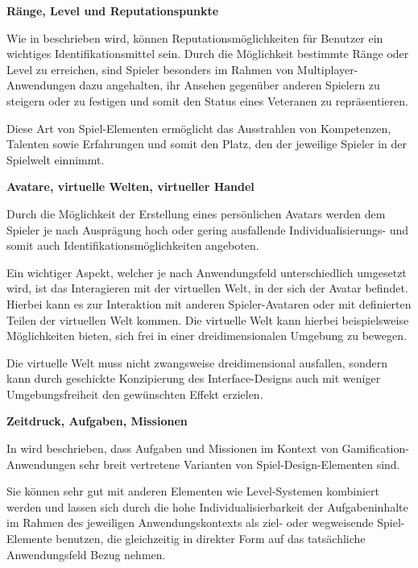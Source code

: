 \documentclass[bibliography=totoc,listof=totoc,BCOR=5mm,DIV=12,oneside]{scrbook}
\begin{document}
\par \bigskip \textbf{Ränge, Level und Reputationspunkte}
\par Wie in \citep[Kapitel 4.5 Reputations, Ranks and Levels, Seite 75]{reeves2009total} beschrieben wird, können Reputationsmöglichkeiten für Benutzer ein wichtiges Identifikationsmittel sein. Durch die Möglichkeit bestimmte Ränge oder Level zu erreichen, sind Spieler besonders im Rahmen von Multiplayer-Anwendungen dazu angehalten, ihr Ansehen gegenüber anderen Spielern zu steigern oder zu festigen und somit den Status eines Veteranen zu repräsentieren.
\par Diese Art von Spiel-Elementen ermöglicht das Ausstrahlen von Kompetenzen, Talenten sowie Erfahrungen und somit den Platz, den der jeweilige Spieler in der Spielwelt einnimmt.

\par \bigskip \textbf{Avatare, virtuelle Welten, virtueller Handel}
\par Durch die Möglichkeit der Erstellung eines persönlichen Avatars werden dem Spieler je nach Ausprägung hoch oder gering ausfallende Individualisierungs- und somit auch Identifikationsmöglichkeiten angeboten. 
\par Ein wichtiger Aspekt, welcher je nach Anwendungsfeld unterschiedlich umgesetzt wird, ist das Interagieren mit der virtuellen Welt, in der sich der Avatar befindet. Hierbei kann es zur Interaktion mit anderen Spieler-Avataren oder mit definierten Teilen der virtuellen Welt kommen. Die virtuelle Welt kann hierbei beispielsweise Möglichkeiten bieten, sich frei in einer dreidimensionalen Umgebung zu bewegen. 
\par Die virtuelle Welt muss nicht zwangsweise dreidimensional ausfallen, sondern kann durch geschickte Konzipierung des Interface-Designs auch mit weniger Umgebungsfreiheit den gewünschten Effekt erzielen.

\par \bigskip \textbf{Zeitdruck, Aufgaben, Missionen}
\par In \citep[Kapitel 6.1.1 Tasks]{pflanzl2018gamification} wird beschrieben, dass Aufgaben und Missionen im Kontext von Gamification-Anwendungen sehr breit vertretene Varianten von Spiel-Design-Elementen sind. 
\par Sie können sehr gut mit anderen Elementen wie Level-Systemen kombiniert werden und lassen sich durch die hohe Individualisierbarkeit der Aufgabeninhalte im Rahmen des jeweiligen Anwendungskontexts als ziel- oder wegweisende Spiel-Elemente benutzen, die gleichzeitig in direkter Form auf das tatsächliche Anwendungsfeld Bezug nehmen.
\end{document}
